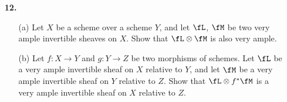 \documentclass[a4paper]{article}
\begin{document}
\begin{enumerate} [label=\textbf{\arabic*.}, leftmargin=0em]
\begin{proof}
\begin{itemize} [leftmargin=0cm]
        Let $x_0, \dots, x_r \in S_1$ be a set of generators of $S_1$ as an $A$-module. Following the argument in (5.13), $S'$ is a ring, containing $S$, and contained in the intersection $\bigcap S_{x_i}$ of the localizations of $S$ at the elements $x_0, \dots, x_r$. By the proof of (5.19), since $S_d'$ is a finitely generated $A$-module for every $d$, there exists $d_0 \geq 0$ such that $S_n S'_d \subseteq S_{n + d} \subseteq S'_{n + d}$ for some large enough $n$ and all $d \geq d_0$. It follows by $S_n S'_d = S'_{n + d}$ that $S_{n + d} = S'_{n + d}$ for all $d \geq d_0$.

        \item[(c)] The natural homomorphism $\alpha$ viewed as a morphism between equivalence classes of quasi-finitely generated graded $S$-modules is an isomorphism by (b). Hence, the two categories are equivalent with $\beta$ from (5.15).

    \end{itemize}
\end{proof}

\item[\textbf{12.}] \begin{itemize}
    \item[(a)] Let $X$ be a scheme over a scheme $Y$, and let $\fL$, $\fM$ be two very ample invertible sheaves on $X$. Show that $\fL \otimes \fM$ is also very ample.

    \item[(b)] Let $f : X \to Y$ and $g : Y \to Z$ be two morphisms of schemes. Let $\fL$ be a very ample invertible sheaf on $X$ relative to $Y$, and let $\fM$ be a very ample invertible sheaf on $Y$ relative to $Z$. Show that $\fL \otimes f^* \fM$ is a very ample invertible sheaf on $X$ relative to $Z$.
\end{itemize}


\end{enumerate}
\end{document}
